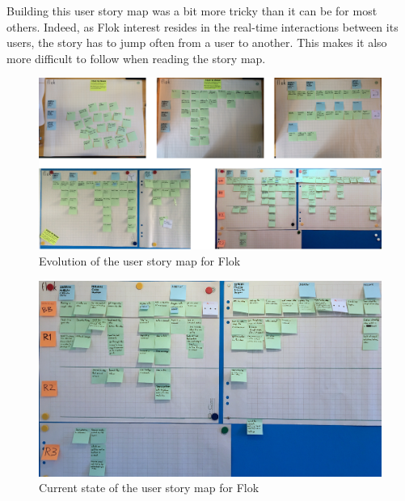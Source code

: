 \documentclass[a4paper,12pt, oneside]{article}
\begin{document}
Building this user story map was a bit more tricky than it can be for most others.
Indeed, as Flok interest resides in the real-time interactions between its users, the story has to jump often from a user to another.
This makes it also more difficult to follow when reading the story map.

\begin{figure}[!htb]
    \centering
    \includegraphics[width=\textwidth]{images/flokUsmEvolution.png}
    \caption{Evolution of the user story map for Flok}
    \label{fig.flokUsmEvolution}
\end{figure}

\begin{figure}[!htb]
    \centering
    \includegraphics[width=\textwidth]{images/flokUsmCurrent.jpg}
    \caption{Current state of the user story map for Flok}
    \label{fig.flokUsmCurrent}
\end{figure}

\FloatBarrier
\end{document}
